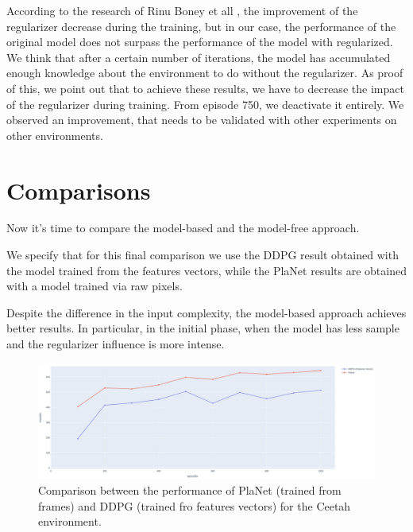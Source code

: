 According to the research of Rinu Boney et all \cite{boney2019regularizing}, the improvement of the regularizer decrease during the training, but in our case, the performance of the original model does not surpass the performance of the model with regularized. 
We think that after a certain number of iterations, the model has accumulated enough knowledge about the environment to do without the regularizer. As proof of this, we point out that to achieve these results, we have to decrease the impact of the regularizer during training. From episode 750, we deactivate it entirely.
We observed an improvement, that needs to be validated with other experiments on other environments.


\section{Comparisons}
Now it's time to compare the model-based and the model-free approach. 

We specify that for this final comparison we use the DDPG result obtained with the model trained from the features vectors, while the PlaNet results are obtained with a model trained via raw pixels.

Despite the difference in the input complexity, the model-based approach achieves better results. In particular, in the initial phase, when the model has less sample and the regularizer influence is more intense.

\begin{figure}[H]
\centering
\includegraphics[width=1 \textwidth, height=.25\textheight]{pictures/ceetah_planet_vs_ddpg}
\caption{ Comparison between the performance of PlaNet (trained from frames) and DDPG (trained fro features vectors) for the Ceetah environment.  }
\end{figure}

